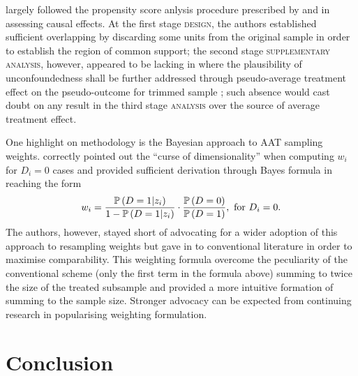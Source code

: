 \textcite{sullivan:2013} largely followed the propensity score anlysis procedure prescribed by \textcite{imbens:2015b} and \textcite{imbens:2015a} in assessing causal effects. At the first stage \textsc{design}, the authors established sufficient overlapping by discarding some units from the original sample in order to establish the region of common support; the second stage \textsc{supplementary analysis}, however, appeared to be lacking in \textcite{sullivan:2013} where the plausibility of unconfoundedness shall be further addressed through pseudo-average treatment effect on the pseudo-outcome for trimmed sample \parencite[see][pp. 383--384]{imbens:2015a}; such absence would cast doubt on any result in the third stage \textsc{analysis} over the source of average treatment effect.

One highlight on methodology is the Bayesian approach to AAT sampling weights. \textcite{sullivan:2013} correctly pointed out the ``curse of dimensionality'' when computing
$w_i$ for $D_i = 0$ cases and provided sufficient derivation through Bayes formula in reaching the form
\[ w_i = \frac{\p{ D=1 | z_i}}{1-\p{ D=1 | z_i}} \cdot \frac{\p{D=0}}{\p{D=1}},\ \text{for}\ D_i=0. \]
The authors, however, stayed short of advocating for a wider adoption of this approach to resampling weights but gave in to conventional literature in order to maximise comparability. This weighting formula overcome the peculiarity of the conventional scheme (only the first term in the formula above) summing to twice the size of the treated subsample and provided a more intuitive formation of summing to the sample size. Stronger advocacy can be expected from continuing research in popularising  weighting formulation.
\section{Conclusion}

